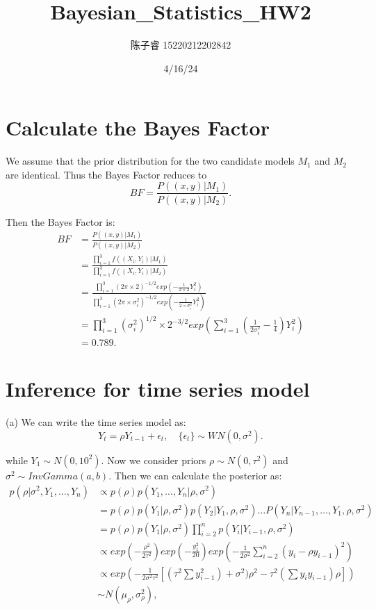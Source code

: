 \documentclass{article}
\title{Bayesian\_Statistics\_HW2}
\author{陈子睿 15220212202842}
\date{4/16/24}
\begin{document}
\maketitle

\section{Calculate the Bayes Factor}
We assume that the prior distribution for the two candidate models $M_1$ and $M_2$ are identical. Thus the Bayes Factor reduces to 
$$
BF = \frac{P((x,y)|M_1)}{P((x,y)|M_2)}.
$$

Then the Bayes Factor is:
\begin{align*}
    BF &= \frac{P((x,y)|M_1)}{P((x,y)|M_2)}\\
    &= \frac{\prod_{i=1}^3f((X_i,Y_i)|M_1)}{\prod_{i=1}^3f((X_i,Y_i)|M_2)} \\
    &= \frac{\prod_{i=1}^3(2\pi\times2)^{-1/2}exp\left(-\frac{1}{2\times2}Y_i^2
    \right)}{\prod_{i=1}^3(2\pi\times\sigma_i^2)^{-1/2}exp\left(-\frac{1}{2\times\sigma_i^2}Y_i^2
    \right)} \\
    &= \prod_{i=1}^3(\sigma_i^2)^{1/2} \times 2^{-3/2}exp\left( \sum_{i=1}^3(\frac{1}{2\sigma_i^2}-\frac{1}{4})Y_i^2
    \right) \\
    &= 0.789.
\end{align*}

\section{Inference for time series model}
(a) We can write the time series model as:
$$
Y_t = \rho Y_{t-1} + \epsilon_t,\quad
\{\epsilon_t\} \sim WN(0,\sigma^2).
$$

while $Y_1 \sim N(0,10^2)$. Now we consider priors $\rho\sim N(0,\tau^2)$ and $\sigma^2\sim InvGamma(a,b)$. Then we can calculate the posterior as:
\begin{align*}
    p(\rho|\sigma^2,Y_1,\dots,Y_n)
    &\propto p(\rho)p(Y_1,\dots,Y_n|\rho,\sigma^2) \\
    &= p(\rho)p(Y_1|\rho,\sigma^2)p(Y_2|Y_1,\rho,\sigma^2)\dots P(Y_n|Y_{n-1},\dots,Y_{1},\rho,\sigma^2)\\
    &=p(\rho)p(Y_1|\rho,\sigma^2)\prod_{i=2}^{n}p(Y_i|Y_{i-1},\rho,\sigma^2)\\
    &\propto exp\left(- \frac{\rho^2}{2\tau^2}\right)exp\left(-\frac{y_1^2}{20} \right)exp\left(-\frac{1}{2\sigma^2}\sum_{i=2}^n(y_i-\rho y_{i-1})^2 \right)\\
    &\propto exp\left( -\frac{1}{2\sigma^2\tau^2}[(\tau^2\sum y_{i-1}^2)+\sigma^2)\rho^2-\tau^2(\sum y_iy_{i-1})\rho ]\right) \\
    &\sim N(\mu_\rho,\sigma^2_\rho),
\end{align*}
\end{document}

